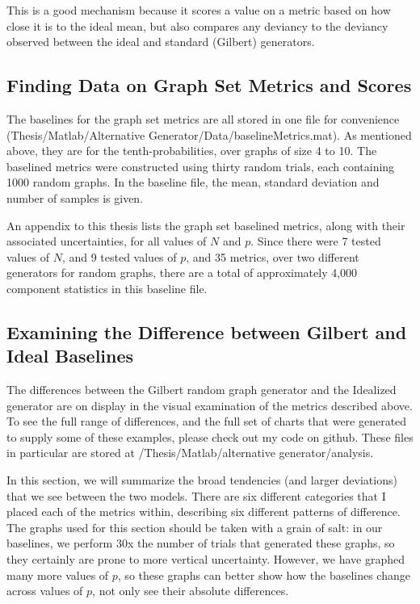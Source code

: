 This is a good mechanism because it scores a value on a metric based on how close it is to the ideal mean, but also compares any deviancy to the deviancy observed between the ideal and standard (Gilbert) generators.

\subsection{Finding Data on Graph Set Metrics and Scores}

The baselines for the graph set metrics are all stored in one file for convenience (Thesis/Matlab/Alternative Generator/Data/baselineMetrics.mat).
As mentioned above, they are for the tenth-probabilities, over graphs of size 4 to 10.
The baselined metrics were constructed using thirty random trials, each containing 1000 random graphs.
In the baseline file, the mean, standard deviation and number of samples is given.

An appendix to this thesis lists the graph set baselined metrics, along with their associated uncertainties, for all values of $N$ and $p$.
Since there were 7 tested values of $N$, and 9 tested values of $p$, and 35 metrics, over two different generators for random graphs, there are a total of approximately 4,000 component statistics in this baseline file.

\subsection{Examining the Difference between Gilbert and Ideal Baselines}

The differences between the Gilbert random graph generator and the Idealized generator are on display in the visual examination of the metrics described above.
To see the full range of differences, and the full set of charts that were generated to supply some of these examples, please check out my code on github.
These files in particular are stored at /Thesis/Matlab/alternative generator/analysis.

In this section, we will summarize the broad tendencies (and larger deviations) that we see between the two models.
There are six different categories that I placed each of the metrics within, describing six different patterns of difference.
The graphs used for this section should be taken with a grain of salt: in our baselines, we perform 30x the number of trials that generated these graphs, so they certainly are prone to more vertical uncertainty.
However, we have graphed many more values of $p$, so these graphs can better show how the baselines change across values of $p$, not only see their absolute differences.

